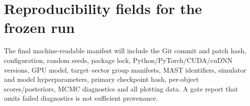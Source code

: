 \documentclass[fleqn,usenatbib]{mnras}
\begin{document}



\appendix
\section{Reproducibility fields for the frozen run}

The final machine-readable manifest will include the Git commit and patch hash,
configuration, random seeds, package lock, Python/PyTorch/CUDA/cuDNN versions,
GPU model, target--sector group manifests, MAST identifiers, simulator and model
hyperparameters, primary checkpoint hash, per-object scores/posteriors, MCMC
diagnostics and all plotting data. A gate report that omits failed diagnostics is
not sufficient provenance.

\label{lastpage}
\end{document}
